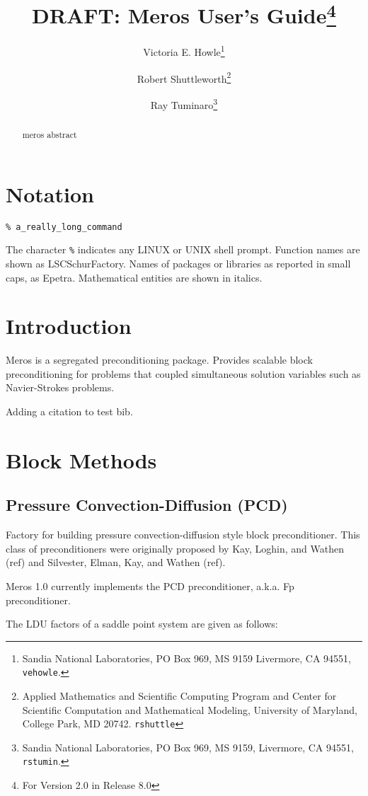 \documentclass[oneeqnum,onefignum,onetabnum,10pt]{SANDreport}
\title{DRAFT: Meros User's Guide\footnote{For \MerosTM{} Version 2.0 in
\TrilinosTM{} Release 8.0}}
\author{
Victoria E. Howle\thanks{Sandia National Laboratories, PO Box 969, MS 9159
    Livermore, CA 94551, {\tt vehowle}\protect@{\tt sandia.gov}.}
  \and
  Robert Shuttleworth\thanks{Applied Mathematics and Scientific Computing Program and Center for Scientific
Computation and Mathematical Modeling,
University of Maryland, College Park, MD 20742. {\tt rshuttle}\protect@{\tt math.umd.edu}}
  \and
  Ray Tuminaro\thanks{Sandia National Laboratories, PO Box 969, MS 9159,
    Livermore, CA 94551, {\tt rstumin}\protect@{\tt sandia.gov}.}
}
\date{}
\begin{document}
\maketitle
\begin{abstract}
meros abstract
\end{abstract}






\SANDmain

\clearpage
\tableofcontents

%
\section{Notation}
\begin{verbatim} 
% a_really_long_command 
\end{verbatim}
The character \verb!%! indicates any LINUX or UNIX shell prompt.
Function names are shown as {\sf LSCSchurFactory}.  Names of packages
or libraries as reported in small caps, as {\sc Epetra}. Mathematical
entities are shown in italics.


\section{Introduction}
Meros is a segregated preconditioning package. Provides scalable block
preconditioning for problems that coupled simultaneous solution
variables such as Navier-Strokes problems. 


Adding a citation to test bib\cite{ElmanSilvesterWathen.book}.

\section{Block Methods}
\subsection{Pressure Convection-Diffusion (PCD)}
Factory for building pressure convection-diffusion style block
preconditioner. This class of preconditioners were originally proposed
by Kay, Loghin, and Wathen (ref) and Silvester, Elman, Kay, and Wathen
(ref).

Meros 1.0 currently implements the PCD preconditioner, a.k.a. Fp
preconditioner. 

The LDU factors of a saddle point system are given as follows:
\end{document}
